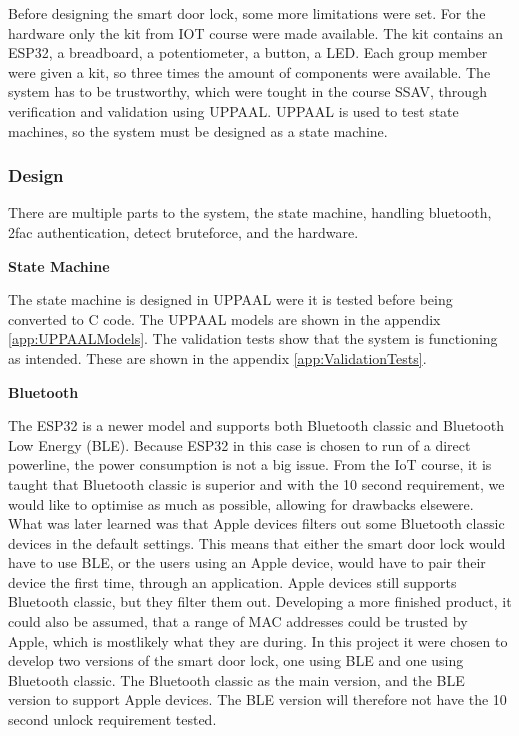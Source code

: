 
Before designing the smart door lock, some more limitations were set.
For the hardware only the kit from IOT course were made available.
The kit contains an ESP32, a breadboard, a potentiometer, a button, a LED.
Each group member were given a kit, so three times the amount of components were available.
The system has to be trustworthy, which were tought in the course SSAV, through verification and validation using UPPAAL.
UPPAAL is used to test state machines, so the system must be designed as a state machine.

\subsubsection{Design}

There are multiple parts to the system, the state machine, handling bluetooth, 2fac authentication, detect bruteforce, and the hardware.

\textbf{State Machine}

The state machine is designed in UPPAAL were it is tested before being converted to C code.
The UPPAAL models are shown in the appendix \ref{app:UPPAALModels}.
The validation tests show that the system is functioning as intended.
These are shown in the appendix \ref{app:ValidationTests}.

\textbf{Bluetooth}

The ESP32 is a newer model and supports both Bluetooth classic and Bluetooth Low Energy (BLE).
Because ESP32 in this case is chosen to run of a direct powerline, the power consumption is not a big issue.
From the IoT course, it is taught that Bluetooth classic is superior and with the 10 second requirement, we would like to optimise as much as possible, allowing for drawbacks elsewere.
What was later learned was that Apple devices filters out some Bluetooth classic devices in the default settings.
This means that either the smart door lock would have to use BLE, or the users using an Apple device, would have to pair their device the first time, through an application.
Apple devices still supports Bluetooth classic, but they filter them out.
Developing a more finished product, it could also be assumed, that a range of MAC addresses could be trusted by Apple, which is mostlikely what they are during.
In this project it were chosen to develop two versions of the smart door lock, one using BLE and one using Bluetooth classic.
The Bluetooth classic as the main version, and the BLE version to support Apple devices.
The BLE version will therefore not have the 10 second unlock requirement tested.

